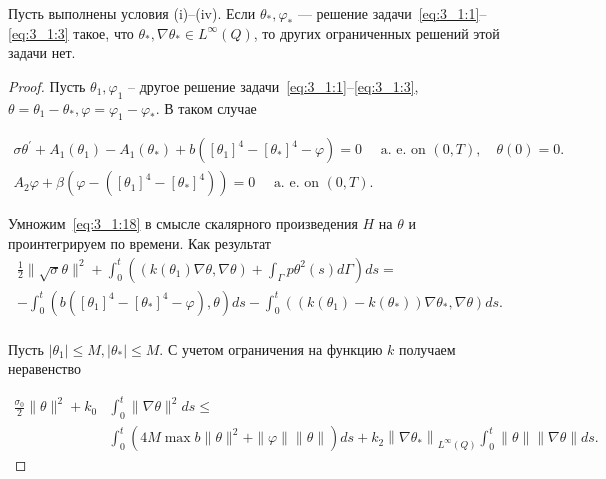 \begin{theorem}
    \label{th:3_1:2}
Пусть выполнены условия (i)–(iv).
Если $\theta_{*}, \varphi_{*}$ — решение
задачи~\eqref{eq:3_1:1}--\eqref{eq:3_1:3} такое,
что $\theta_{*}, \nabla \theta_{*} \in L^{\infty }(Q)$,
то других ограниченных решений этой задачи нет.
\end{theorem}

\begin{proof}
Пусть $\theta_{1}, \varphi_{1}$ -- другое решение
задачи~\eqref{eq:3_1:1}--\eqref{eq:3_1:3},
$\theta=\theta_{1}-\theta_{*}, \varphi=\varphi_{ 1}-\varphi_{*}$.
В таком случае

\begin{gather}
    \sigma \theta^{\prime}+A_{1}\left(\theta_{1}\right)
    -A_{1}\left(\theta_{*}\right)+b\left(\left[\theta_{1}\right]^{4}-
    \left[\theta_{*}\right]^{4}-\varphi\right)=0
    \quad \text { a. e. on }(0, T), \quad \theta(0)=0. \label{eq:3_1:18} \\
    A_{2} \varphi+\beta\left(\varphi-\left(\left[\theta_{1}\right]^{4}
    -\left[\theta_{*}\right]^{4}\right)\right)=0
    \quad \text { a. e. on }(0, T). \label{eq:3_1:19}
\end{gather}



Умножим~\eqref{eq:3_1:18} в смысле скалярного произведения
$H$ на $\theta$ и проинтегрируем по времени.
Как результат
\begin{gather*}
    \frac{1}{2}\|\sqrt{\sigma} \theta\|^{2}+
    \int_{0}^{t}\left(\left(k\left(\theta_{1}\right) \nabla \theta,
    \nabla \theta\right)+\int_{\Gamma} p \theta^{2}(s) d \Gamma\right) d s=\\
    -\int_{0}^{t}\left(b\left(\left[\theta_{1}\right]^{4}-
    \left[\theta_{*}\right]^{4}-\varphi\right),
    \theta\right) d s-\int_{0}^{t}\left(\left(k\left(\theta_{1}\right)
    -k\left(\theta_{*}\right)\right)
    \nabla \theta_{*}, \nabla \theta\right) d s.\\
\end{gather*}

Пусть $\left|\theta_{1}\right| \leq M,\left|\theta_{*}\right| \leq M$.
С учетом ограничения на функцию $k$ получаем неравенство

\begin{equation}
    \label{eq:3_1:20}
    \begin{aligned}
        \frac{\sigma_{0}}{2}\|\theta\|^{2}+k_{0}
        & \int_{0}^{t}\|\nabla \theta\|^{2} d s \leq \\
        & \int_{0}^{t}\left(4 M \max b\|\theta\|^{2}
        +\|\varphi\|\|\theta\|\right) d s
        +k_{2}\left\|\nabla \theta_{*}\right\|_{L^{\infty}(Q)}
        \int_{0}^{t}\|\theta\|\|\nabla \theta\| d s.
    \end{aligned}
\end{equation}



\end{proof}
